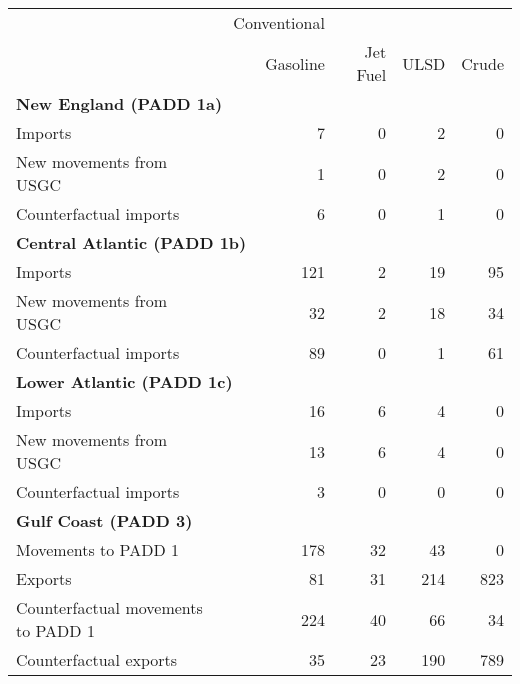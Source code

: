 \begin{tabular}{lrrrr}
   \midrule & Conventional & &  & \\

                            & Gasoline & Jet Fuel & ULSD & Crude \\ 
                            \midrule \multicolumn{5}{l}{\textbf{New England (PADD 1a)}} \\
Imports & 7 & 0 & 2 & 0 \\ 
  New movements from USGC & 1 & 0 & 2 & 0 \\ 
  Counterfactual imports & 6 & 0 & 1 & 0 \\ 
   \midrule \multicolumn{5}{l}{\textbf{Central Atlantic (PADD 1b)}} \\
Imports & 121 & 2 & 19 & 95 \\ 
  New movements from USGC & 32 & 2 & 18 & 34 \\ 
  Counterfactual imports & 89 & 0 & 1 & 61 \\ 
   \midrule \multicolumn{5}{l}{\textbf{Lower Atlantic (PADD 1c)}} \\
Imports & 16 & 6 & 4 & 0 \\ 
  New movements from USGC & 13 & 6 & 4 & 0 \\ 
  Counterfactual imports & 3 & 0 & 0 & 0 \\ 
   \midrule \multicolumn{5}{l}{\textbf{Gulf Coast (PADD 3)}} \\
Movements to PADD 1 & 178 & 32 & 43 & 0 \\ 
  Exports & 81 & 31 & 214 & 823 \\ 
  Counterfactual movements to PADD 1 & 224 & 40 & 66 & 34 \\ 
  Counterfactual exports & 35 & 23 & 190 & 789 \\ 
   \hline
\end{tabular}
